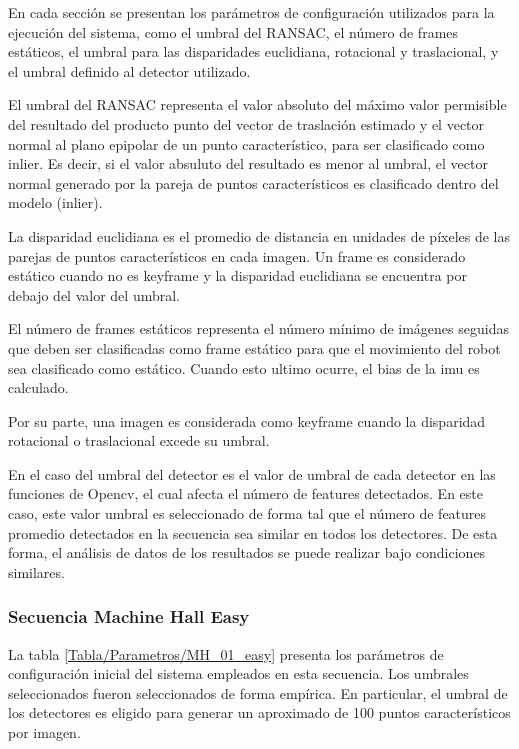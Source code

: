  
En cada sección se presentan los parámetros de configuración utilizados para la ejecución del sistema, como el umbral del RANSAC, el número de frames estáticos, el umbral para las disparidades euclidiana, rotacional y traslacional, y el umbral definido al detector utilizado. 
 
 El umbral del RANSAC representa el valor absoluto del máximo valor permisible del resultado del producto punto del vector de traslación estimado y el vector normal al plano epipolar de un punto característico, para ser clasificado como inlier. Es decir, si el valor absuluto del resultado es menor al umbral, el vector normal generado por la pareja de puntos característicos es clasificado dentro del modelo (inlier).
 
 La disparidad euclidiana es el promedio de distancia en unidades de píxeles de las parejas de puntos característicos en cada imagen. Un frame es considerado estático cuando no es keyframe y la disparidad euclidiana se encuentra por debajo del valor del umbral.
 
 El número de frames estáticos representa el número mínimo de imágenes seguidas que deben ser clasificadas como frame estático para que el movimiento del robot sea clasificado como estático. Cuando esto ultimo ocurre, el bias de la imu es calculado.

 Por su parte, una imagen es considerada como keyframe cuando la disparidad rotacional o traslacional excede su umbral.
 
 En el caso del umbral del detector es el valor de umbral de cada detector en las funciones de Opencv, el cual afecta el número de features detectados. En este caso, este valor umbral es seleccionado de forma tal que el número de features promedio detectados en la secuencia sea similar en todos los detectores. De esta forma, el análisis de datos de los resultados se puede realizar bajo condiciones similares.

\subsubsection{Secuencia Machine Hall Easy}


La tabla \ref{Tabla/Parametros/MH_01_easy} presenta los parámetros de configuración inicial del sistema empleados en esta secuencia. Los umbrales seleccionados fueron seleccionados de forma empírica. En particular, el umbral de los detectores es eligido para generar un aproximado de 100 puntos característicos por imagen.


